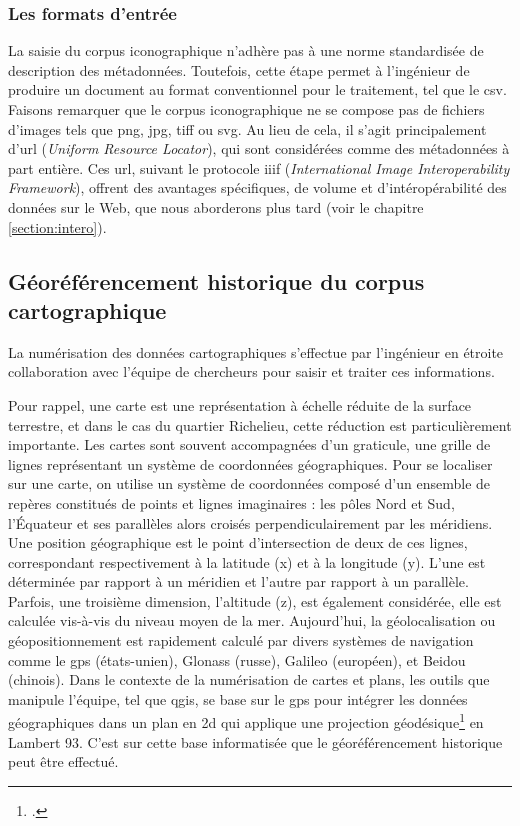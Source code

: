 \subsubsection{Les formats d'entrée}
La saisie du corpus iconographique n'adhère pas à une norme standardisée de description des métadonnées. Toutefois, cette étape permet à l'ingénieur de produire un document au format conventionnel pour le traitement, tel que le \acrshort{csv}. Faisons remarquer que le corpus iconographique ne se compose pas de fichiers d'images tels que \acrshort{png}, \acrshort{jpg}, \acrshort{tiff} ou \acrshort{svg}. Au lieu de cela, il s'agit principalement d'\acrshort{url} (\textit{Uniform Resource Locator}), qui sont considérées comme des métadonnées à part entière. Ces \acrshort{url}, suivant le protocole \acrshort{iiif} (\textit{International Image Interoperability Framework}), offrent des avantages spécifiques, de volume et d'intéropérabilité des données sur le Web, que nous aborderons plus tard (voir le chapitre \ref{section:intero}). 

\subsection{Géoréférencement historique du corpus cartographique}
La numérisation des données cartographiques s'effectue par l'ingénieur en étroite collaboration avec l'équipe de chercheurs pour saisir et traiter ces informations. 

Pour rappel, une carte est une représentation à échelle réduite de la surface terrestre, et dans le cas du quartier Richelieu, cette réduction est particulièrement importante. Les cartes sont souvent accompagnées d'un graticule, une grille de lignes représentant un système de coordonnées géographiques. Pour se localiser sur une carte, on utilise un système de coordonnées composé d'un ensemble de repères constitués de points et lignes imaginaires : les pôles Nord et Sud, l'Équateur et ses parallèles alors croisés perpendiculairement par les méridiens. Une position géographique est le point d'intersection de deux de ces lignes, correspondant respectivement à la latitude (x) et à la longitude (y). L'une est déterminée par rapport à un méridien et l'autre par rapport à un parallèle. Parfois, une troisième dimension, l'altitude (z), est également considérée, elle est calculée vis-à-vis du niveau moyen de la mer. Aujourd'hui, la géolocalisation ou géopositionnement est  rapidement calculé par divers systèmes de navigation comme le \acrshort{gps} (états-unien), Glonass (russe), Galileo (européen), et Beidou (chinois). Dans le contexte de la numérisation de cartes et plans, les outils que manipule l'équipe, tel que \acrshort{qgis}, se base sur le \acrshort{gps} pour intégrer les données géographiques dans un plan en \acrshort{2d} qui applique une projection géodésique\footcite{GEOCONFLUENCESProjection2022} en Lambert 93. C'est sur cette base informatisée que le géoréférencement historique peut être effectué.


